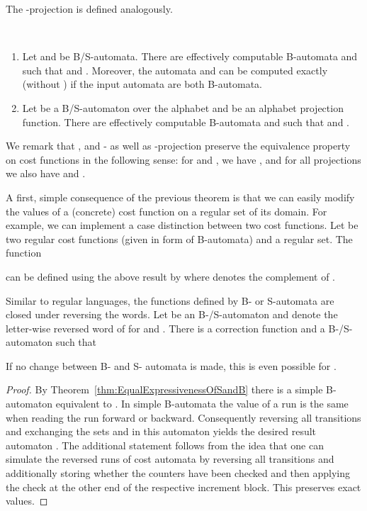 \documentclass{LMCS}
\begin{document}
The -projection is defined analogously. 

\begin{thm}\
\label{thm:ClosureOfRegularCostFunctions}
	\begin{enumerate}[label=(\roman*)]
		\item Let  and  be B/S-automata. There are
effectively computable B-automata  and
 such that  and
.
	Moreover, the automata  and  can 
	be computed exactly (without ) if the input automata are 
	both B-automata.
		\item Let  be a B/S-automaton over the alphabet 
and  be an alphabet projection function. There are
effectively computable B-automata  and 
such that  and
.
	\end{enumerate}
\end{thm}


\noindent We remark that ,  and - as well as
-projection preserve the equivalence property  on
cost functions in the following sense: for  and , we have ,
 and for all projections  we
also have  and .


A first, simple consequence of the previous theorem is that we can easily
modify the values of a (concrete) cost function on a regular set of its domain. For
example, we can implement a case distinction between two cost functions.
Let  be two regular cost functions (given in form of B-automata) 
and  a regular set. 
The function 

can be defined using the above result by  where  denotes the
complement of . 


\begin{rem}\label{rem:ClosureUnderReversing}
	Similar to regular languages, the functions defined by B- or S-automata are
	closed under reversing the words. 
	Let  be an B-/S-automaton and  denote
    the letter-wise reversed word of  for 
    and . There is a correction function  and 
    a B-/S-automaton  such that 

	If no change between B- and S- automata is made, this is even possible for
	. 
\end{rem}
\begin{proof}
	By Theorem~\ref{thm:EqualExpressivenessOfSandB} there is a simple
B-automaton equivalent to . In simple B-automata the value of a
run is the same when reading the run forward or backward. Consequently
reversing all transitions and exchanging the sets  and  in this 
automaton yields the desired result automaton . 
The additional statement follows from the idea that one can simulate the 
reversed runs of cost automata by reversing all transitions and additionally 
storing whether the counters have been checked and then applying the check at
the other end of the respective increment block. This preserves exact values.
\end{proof}  
\end{document}
